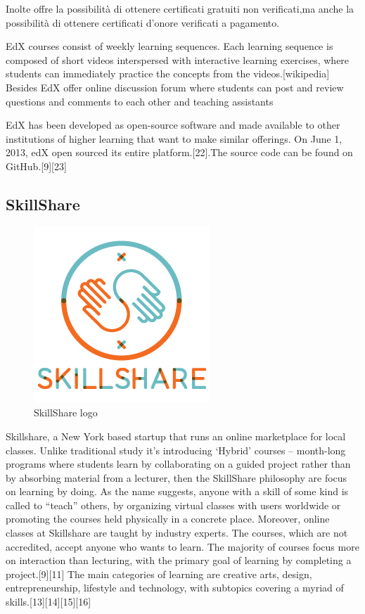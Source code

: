 Inolte offre la possibilità di ottenere certificati gratuiti non verificati,ma anche la possibilità di ottenere certificati d’onore verificati a pagamento.

EdX courses consist of weekly learning sequences. Each learning sequence is composed of short videos interspersed with interactive learning exercises, where students can immediately practice the concepts from the videos.[wikipedia]
Besides EdX offer online discussion forum where students can post and review questions and comments to each other and teaching assistants

EdX has been developed as open-source software and made available to other institutions of higher learning that want to make similar offerings. On June 1, 2013, edX open sourced its entire platform.[22].The source code can be found on GitHub.[9][23]


\subsection{SkillShare}
\label{subsec:SkillShare}
\begin{figure}[htb] %
 \centering
 \includegraphics[width=0.5\linewidth]{images/chapter1/skillshare.jpg}\hfill
 \caption[SkillShare logo]{SkillShare logo}
 \label{fig:fourV}
\end{figure}




Skillshare, a New York based startup that runs an online marketplace for local classes.
Unlike traditional study it’s introducing ‘Hybrid’ courses – month-long programs where students learn by collaborating on a guided project rather than by absorbing material from a lecturer, then the SkillShare philosophy are focus on learning by doing.
As the name suggests, anyone with a skill of some kind is called to “teach” others, by organizing virtual classes with users worldwide or promoting the courses held physically in a concrete place.
Moreover, online classes at Skillshare are taught by industry experts. The courses, which are not accredited, accept anyone who wants to learn. The majority of courses focus more on interaction than lecturing, with the primary goal of learning by completing a project.[9][11] The main categories of learning are creative arts, design, entrepreneurship, lifestyle and technology, with subtopics covering a myriad of skills.[13][14][15][16]

